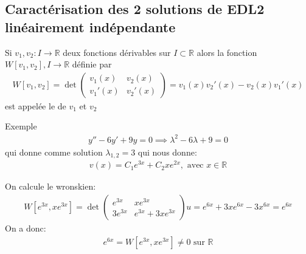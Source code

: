 \subsection{Caractérisation des 2 solutions de EDL2 linéairement indépendante}
\begin{definition}
    Si $v_1, v_2 : I \to \mathbb{R}$ deux fonctions dérivables sur $I \subset \mathbb{R}$ alors la fonction $W[v_1, v_2], I \to \mathbb{R}$ définie par 
    \begin{align*}
        W[v_1, v_2] = \det \begin{pmatrix}
            v_1(x) &v_2(x) \\
            v_1'(x) & v_2'(x)
        \end{pmatrix}
        = v_1(x)v_2'(x) - v_2(x)v_1'(x)
    \end{align*}
    est appelée le  de $v_1$ et $v_2$
    
\end{definition}
\begin{parag}{Exemple}
    \begin{align*}
        y'' - 6y' + 9y = 0 \implies \lambda^2 - 6 \lambda + 9 = 0
    \end{align*}
    qui donne comme solution $ \lambda_{1, 2} = 3$ qui nous donne:
    \begin{align*}
        v(x) = C_1 e^{3x} + C_2xe^{2x}, \text{ avec } x \in \mathbb{R}
    \end{align*}

    On calcule le wronskien:
    \begin{align*}
        W[e^{3x}, xe^{3x}] = \det \begin{pmatrix}
            e^{3x} & xe^{3x} \\
            3e^{3x} & e^{3x} + 3xe^{3x}
        \end{pmatrix}
        u
        = e^{6x} + 3xe^{6x} - 3x^{6x} = e^{6x}
    \end{align*}
    On a donc:
   \begin{align*}
    e^{6x} = W[e^{3x}, xe^{3x}] \neq 0 \text{ sur } \mathbb{R}
   \end{align*}
    
    
    

\end{parag}

